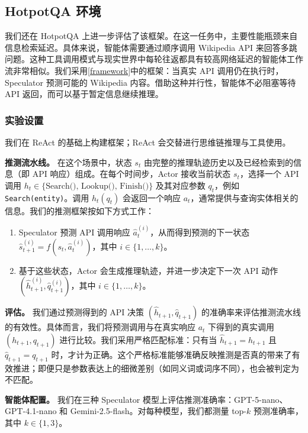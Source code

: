 \subsection{HotpotQA 环境}
\label{subsec:hotpotqa}
我们还在 HotpotQA 上进一步评估了该框架。在这一任务中，主要性能瓶颈来自信息检索延迟。具体来说，智能体需要通过顺序调用 Wikipedia API 来回答多跳问题\cite{yang2018hotpotqadatasetdiverseexplainable}。这种工具调用模式与现实世界中每轮往返都具有较高网络延迟的智能体工作流非常相似。我们采用\cref{framework}中的框架：当真实 API 调用仍在执行时，Speculator 预测可能的 Wikipedia 内容。借助这种并行性，智能体不必阻塞等待 API 返回，而可以基于暂定信息继续推理。

\subsubsection{实验设置}
我们在 ReAct\cite{yao2023reactsynergizingreasoningacting} 的基础上构建框架；ReAct 会交替进行思维链推理与工具使用。

\textbf{推测流水线。} 在这个场景中，状态 $s_t$ 由完整的推理轨迹历史以及已经检索到的信息（即 API 响应）组成。在每个时间步，Actor 接收当前状态 $s_t$，选择一个 API 调用 $h_t \in\{\text{Search(), Lookup(), Finish()}\}$ 及其对应参数 $q_t$，例如 \texttt{Search(entity)}。调用 $h_t(q_t)$ 会返回一个响应 $a_t$，通常提供与查询实体相关的信息。我们的推测框架按如下方式工作：
\begin{enumerate}[leftmargin=*]
    \item Speculator 预测 API 调用响应 $\hat{a}_t^{(i)}$，从而得到预测的下一状态 $\hat{s}_{t+1}^{(i)} = f(s_t,\hat{a}_t^{(i)})$，其中 $i\in\{1,\dots,k\}$。
    \item 基于这些状态，Actor 会生成推理轨迹，并进一步决定下一次 API 动作 $(\hat{h}_{t+1}^{(i)}, \hat{q}_{t+1}^{(i)})$，其中 $i\in\{1,\dots,k\}$。
\end{enumerate}

\textbf{评估。}
我们通过预测得到的 API 决策 $(\hat{h}_{t+1}, \hat{q}_{t+1})$ 的准确率来评估推测流水线的有效性。具体而言，我们将预测调用与在真实响应 $a_t$ 下得到的真实调用 $(h_{t+1}, q_{t+1})$ 进行比较。我们采用严格匹配标准：只有当 $\hat{h}_{t+1} = h_{t+1}$ 且 $\hat{q}_{t+1} = q_{t+1}$ 时，才计为正确。这个严格标准能够准确反映推测是否真的带来了有效推进；即便只是参数表达上的细微差别（如同义词或词序不同），也会被判定为不匹配。

\textbf{智能体配置。}
我们在三种 Speculator 模型上评估推测准确率：GPT-5-nano、GPT-4.1-nano 和 Gemini-2.5-flash。对每种模型，我们都测量 top-$k$ 预测准确率，其中 $k \in \{1,3\}$。

